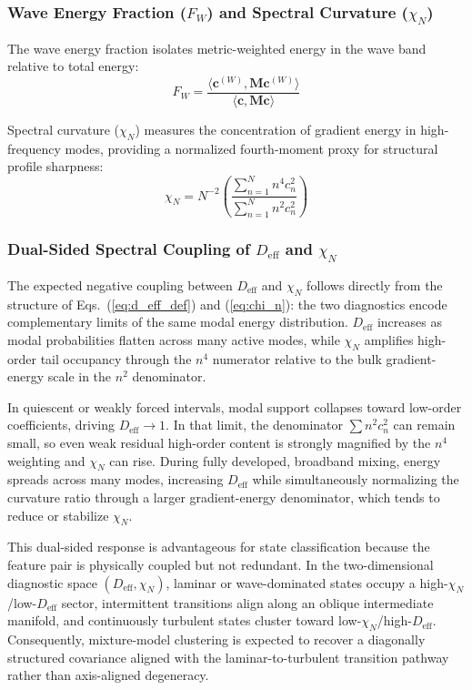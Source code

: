 \documentclass[11pt,a4paper]{article}
\begin{document}
\subsubsection{Wave Energy Fraction (\texorpdfstring{$F_W$}{FW}) and Spectral Curvature (\texorpdfstring{$\chi_N$}{ChiN})}

The wave energy fraction isolates metric-weighted energy in the wave band relative to total energy:
\begin{equation}
F_W = \frac{\langle \mathbf{c}^{(W)}, \mathbf{M} \mathbf{c}^{(W)} \rangle}{\langle \mathbf{c}, \mathbf{M} \mathbf{c} \rangle}
\label{eq:f_w}
\end{equation}

Spectral curvature ($\chi_N$) measures the concentration of gradient energy in high-frequency modes, providing a normalized fourth-moment proxy for structural profile sharpness:
\begin{equation}
\chi_N = N^{-2} \left( \frac{\sum_{n=1}^{N} n^4 c_n^2}{\sum_{n=1}^{N} n^2 c_n^2} \right)
\label{eq:chi_n}
\end{equation}

\subsubsection{Dual-Sided Spectral Coupling of \texorpdfstring{$D_{\mathrm{eff}}$}{Deff} and \texorpdfstring{$\chi_N$}{ChiN}}
The expected negative coupling between $D_{\mathrm{eff}}$ and $\chi_N$ follows directly from the structure of Eqs.~(\ref{eq:d_eff_def}) and (\ref{eq:chi_n}): the two diagnostics encode complementary limits of the same modal energy distribution. $D_{\mathrm{eff}}$ increases as modal probabilities flatten across many active modes, while $\chi_N$ amplifies high-order tail occupancy through the $n^4$ numerator relative to the bulk gradient-energy scale in the $n^2$ denominator.

In quiescent or weakly forced intervals, modal support collapses toward low-order coefficients, driving $D_{\mathrm{eff}} \to 1$. In that limit, the denominator $\sum n^2 c_n^2$ can remain small, so even weak residual high-order content is strongly magnified by the $n^4$ weighting and $\chi_N$ can rise. During fully developed, broadband mixing, energy spreads across many modes, increasing $D_{\mathrm{eff}}$ while simultaneously normalizing the curvature ratio through a larger gradient-energy denominator, which tends to reduce or stabilize $\chi_N$.

This dual-sided response is advantageous for state classification because the feature pair is physically coupled but not redundant. In the two-dimensional diagnostic space $(D_{\mathrm{eff}}, \chi_N)$, laminar or wave-dominated states occupy a high-$\chi_N$/low-$D_{\mathrm{eff}}$ sector, intermittent transitions align along an oblique intermediate manifold, and continuously turbulent states cluster toward low-$\chi_N$/high-$D_{\mathrm{eff}}$. Consequently, mixture-model clustering is expected to recover a diagonally structured covariance aligned with the laminar-to-turbulent transition pathway rather than axis-aligned degeneracy.
\end{document}
